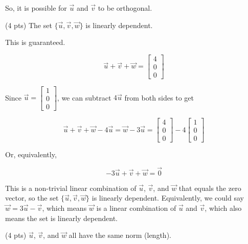 \documentclass[11pt]{article}
\begin{document}
\begin{prob}[(12 pts)]
\begin{subprob}
\begin{solution}
So, it is possible for $\vec u$ and $\vec v$ to be orthogonal.
\end{solution}
\end{subprob}

\begin{subprob}(4 pts) The set $\{\vec u, \vec v, \vec w\}$ is linearly dependent.

  
    
\emptybox{4.75cm}

\begin{solution}
This is guaranteed. 

$$\vec u + \vec v + \vec w = \begin{bmatrix} 4 \\ 0 \\ 0 \end{bmatrix}$$

Since $\vec u = \begin{bmatrix} 1 \\ 0 \\ 0 \end{bmatrix}$, we can subtract $4 \vec u$ from both sides to get

$$\vec u + \vec v + \vec w - 4 \vec u = \vec w - 3 \vec u = \begin{bmatrix} 4 \\ 0 \\ 0 \end{bmatrix} - 4 \begin{bmatrix} 1 \\ 0 \\ 0 \end{bmatrix}$$

Or, equivalently,

$$- 3 \vec u + \vec v + \vec w = \vec 0$$

This is a non-trivial linear combination of $\vec u$, $\vec v$, and $\vec w$ that equals the zero vector, so the set $\{\vec u, \vec v, \vec w\}$ is linearly dependent. Equivalently, we could say $\vec w = 3 \vec u - \vec v$, which means $\vec w$ is a linear combination of $\vec u$ and $\vec v$, which also means the set is linearly dependent.


\end{solution}
\end{subprob}

\begin{subprob}(4 pts) $\vec u$, $\vec v$, and $\vec w$ all have the same norm (length).


\end{subprob}
\end{prob}
\end{document}
